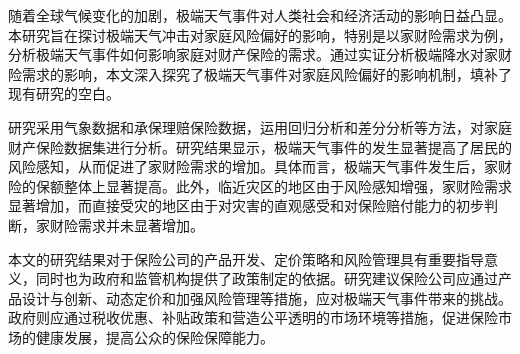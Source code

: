 \begin{cabstract}

    随着全球气候变化的加剧，极端天气事件对人类社会和经济活动的影响日益凸显。本研究旨在探讨极端天气冲击对家庭风险偏好的影响，特别是以家财险需求为例，分析极端天气事件如何影响家庭对财产保险的需求。通过实证分析极端降水对家财险需求的影响，本文深入探究了极端天气事件对家庭风险偏好的影响机制，填补了现有研究的空白。

    研究采用气象数据和承保理赔保险数据，运用回归分析和差分分析等方法，对家庭财产保险数据集进行分析。研究结果显示，极端天气事件的发生显著提高了居民的风险感知，从而促进了家财险需求的增加。具体而言，极端天气事件发生后，家财险的保额整体上显著提高。此外，临近灾区的地区由于风险感知增强，家财险需求显著增加，而直接受灾的地区由于对灾害的直观感受和对保险赔付能力的初步判断，家财险需求并未显著增加。

    本文的研究结果对于保险公司的产品开发、定价策略和风险管理具有重要指导意义，同时也为政府和监管机构提供了政策制定的依据。研究建议保险公司应通过产品设计与创新、动态定价和加强风险管理等措施，应对极端天气事件带来的挑战。政府则应通过税收优惠、补贴政策和营造公平透明的市场环境等措施，促进保险市场的健康发展，提高公众的保险保障能力。

\end{cabstract}
